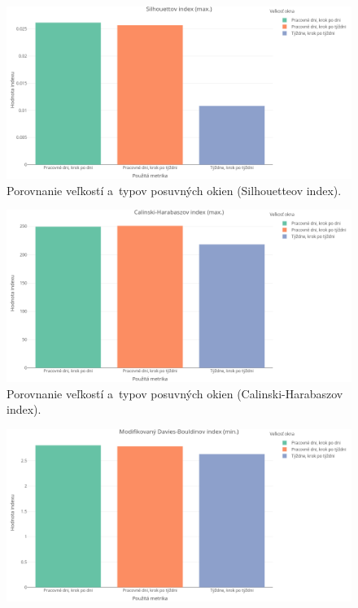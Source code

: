 \documentclass[a4paper,twoside,slovak,12pt,appendix]{article}
\begin{document}
\begin{appendices}
\begin{figure}[htbp]
  \centering
  \includegraphics[width=\textwidth]{cvi/window_comparison/201903072017-Sil-window_comparison.png}
  \caption{Porovnanie veľkostí a~typov posuvných okien (Silhouetteov index).}
\end{figure}
\begin{figure}[htbp]
  \centering
  \includegraphics[width=\textwidth]{cvi/window_comparison/201903072017-CH-window_comparison.png}
  \caption{Porovnanie veľkostí a~typov posuvných okien (Calinski-Harabaszov index).}
\end{figure}
\begin{figure}[htbp]
  \centering
  \includegraphics[width=\textwidth]{cvi/window_comparison/201903072017-DBstar-window_comparison.png}

\end{figure}
\end{appendices}
\end{document}
